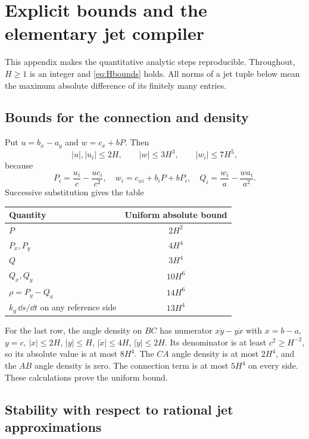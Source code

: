 \section{Explicit bounds and the elementary jet compiler}\label{sec:bounds}

This appendix makes the quantitative analytic steps reproducible. Throughout, $H\ge1$ is an integer and \eqref{eq:Hbounds} holds. All norms of a jet tuple below mean the maximum absolute difference of its finitely many entries.

\subsection{Bounds for the connection and density}

Put $u=b_x-a_y$ and $w=c_x+bP$. Then
\[
|u|,|u_i|\le2H,\qquad
|w|\le3H^3,\qquad |w_i|\le7H^5,
\]
because
\[
P_i=\frac{u_i}{c}-\frac{u c_i}{c^2},\quad
w_i=c_{xi}+b_iP+bP_i,\quad
Q_i=\frac{w_i}{a}-\frac{wa_i}{a^2}.
\]
Successive substitution gives the table
\begin{center}
\begin{tabular}{lc}
\toprule
Quantity & Uniform absolute bound\\
\midrule
$P$ & $2H^2$\\
$P_x,P_y$ & $4H^4$\\
$Q$ & $3H^4$\\
$Q_x,Q_y$ & $10H^6$\\
$\rho=P_y-Q_x$ & $14H^6$\\
$k_g\,\dd s/\dd t$ on any reference side & $13H^4$\\
\bottomrule
\end{tabular}
\end{center}
For the last row, the angle density on $BC$ has numerator
$x\dot y-y\dot x$ with $x=b-a$, $y=c$,
$|x|\le2H$, $|y|\le H$, $|\dot x|\le4H$, $|\dot y|\le2H$.
Its denominator is at least $c^2\ge H^{-2}$, so its absolute value is at most $8H^4$. The $CA$ angle density is at most $2H^4$, and the $AB$ angle density is zero. The connection term is at most $5H^4$ on every side. These calculations prove the uniform bound.

\subsection{Stability with respect to rational jet approximations}

